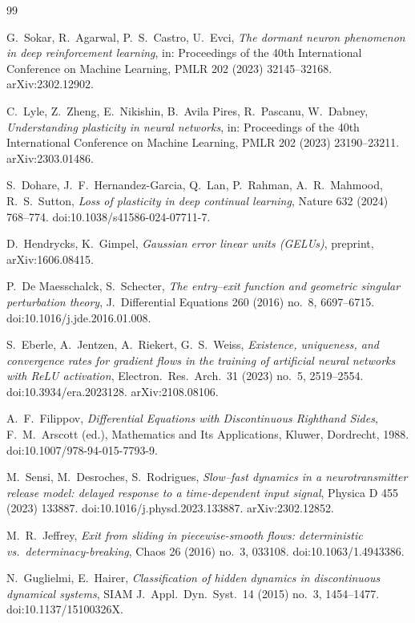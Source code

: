 \documentclass[11pt]{article}
\theoremstyle{definition}
\theoremstyle{remark}
\begin{document}
\begin{thebibliography}{99}

 G.~Sokar, R.~Agarwal, P.~S.~Castro, U.~Evci, \emph{The dormant
neuron phenomenon in deep reinforcement learning}, in: Proceedings of the 40th
International Conference on Machine Learning, PMLR 202 (2023) 32145--32168.
arXiv:2302.12902.

 C.~Lyle, Z.~Zheng, E.~Nikishin, B.~Avila Pires, R.~Pascanu,
W.~Dabney, \emph{Understanding plasticity in neural networks}, in: Proceedings of
the 40th International Conference on Machine Learning, PMLR 202 (2023)
23190--23211. arXiv:2303.01486.

 S.~Dohare, J.~F.~Hernandez-Garcia, Q.~Lan, P.~Rahman,
A.~R.~Mahmood, R.~S.~Sutton, \emph{Loss of plasticity in deep continual
learning}, Nature 632 (2024) 768--774. doi:10.1038/s41586-024-07711-7.

 D.~Hendrycks, K.~Gimpel, \emph{Gaussian error linear units
(GELUs)}, preprint, arXiv:1606.08415.

 P.~De Maesschalck, S.~Schecter, \emph{The entry--exit function
and geometric singular perturbation theory}, J.~Differential Equations 260 (2016)
no.~8, 6697--6715. doi:10.1016/j.jde.2016.01.008.

 S.~Eberle, A.~Jentzen, A.~Riekert, G.~S.~Weiss, \emph{Existence,
uniqueness, and convergence rates for gradient flows in the training of
artificial neural networks with ReLU activation}, Electron.\ Res.\ Arch.\ 31
(2023) no.~5, 2519--2554. doi:10.3934/era.2023128. arXiv:2108.08106.

 A.~F.~Filippov, \emph{Differential Equations with Discontinuous
Righthand Sides}, F.~M.~Arscott (ed.), Mathematics and Its Applications, Kluwer,
Dordrecht, 1988. doi:10.1007/978-94-015-7793-9.

 M.~Sensi, M.~Desroches, S.~Rodrigues, \emph{Slow--fast dynamics
in a neurotransmitter release model: delayed response to a time-dependent input
signal}, Physica D 455 (2023) 133887. doi:10.1016/j.physd.2023.133887.
arXiv:2302.12852.

 M.~R.~Jeffrey, \emph{Exit from sliding in piecewise-smooth flows:
deterministic vs.\ determinacy-breaking}, Chaos 26 (2016) no.~3, 033108.
doi:10.1063/1.4943386.

 N.~Guglielmi, E.~Hairer, \emph{Classification of hidden dynamics
in discontinuous dynamical systems}, SIAM J.~Appl.\ Dyn.\ Syst.\ 14 (2015)
no.~3, 1454--1477. doi:10.1137/15100326X.


\end{thebibliography}
\end{document}
